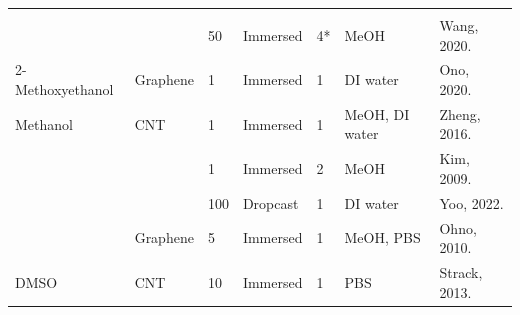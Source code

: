 \documentclass[
  a4paper,
]{scrbook}
\begin{document}
\begin{landscape}
\begin{center}
\begin{longtable}[]{@{}lllllll@{}}
\cite{Khan2020} \\
& & 50 & Immersed & 4* & MeOH & Wang, 2020. \cite{Wang2020} \\
2-Methoxyethanol & Graphene & 1 & Immersed & 1 & DI water & Ono, 2020.
\cite{Ono2020} \\
Methanol & CNT & 1 & Immersed & 1 & MeOH, DI water & Zheng, 2016.
\cite{Zheng2016} \\
& & 1 & Immersed & 2 & MeOH & Kim, 2009. \cite{Kim2009} \\
& & 100 & Dropcast & 1 & DI water & Yoo, 2022. \cite{Yoo2022} \\
& Graphene & 5 & Immersed & 1 & MeOH, PBS & Ohno, 2010.
\cite{Ohno2010} \\
DMSO & CNT & 10 & Immersed & 1 & PBS & Strack, 2013.
\cite{Strack2013} \\
\end{longtable}

\end{center}
\end{landscape}
\restoregeometry %
\end{document}
